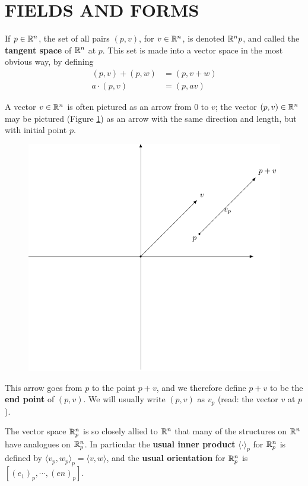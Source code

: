 \clearpage
\section{FIELDS AND FORMS}
If $p\in\mathbb{R}^n$, the set of all pairs $(p,v)$, for $v\in \mathbb{R}^n$, is denoted $\mathbb{R}^n p$, and 
called the \textbf{tangent space} of $\mathbb{R}^n$ at $p$. This set is made into a vector space in 
the most obvious way, by defining
\begin{align*}
    (p,v) + (p,w) & = (p, v+w) \\
    a\cdot (p, v) & = (p, av)
\end{align*}

A vector $v\in\mathbb{R}^n$ is often pictured as an arrow from 0 to $v$; the
vector $(p,v)\in\mathbb{R}^n$ may be pictured (Figure \ref{Fig 4-1}) as an arrow
with the same direction and length, but with initial point $p$.

\begin{figure}[H]
    \centering
    \includegraphics[width=.75\linewidth]{./pics/Fig4-1.pdf}
    \caption{}
    \label{Fig 4-1}
\end{figure}

This arrow goes from $p$ to the point $p + v$, and we therefore
define $p + v$ to be the \textbf{end point} of $(p,v)$.
We will usually write $(p,v)$ as $v_p$ (read: the vector $v$ at $p$).

The vector space $\mathbb{R}^n_p$ is so closely allied to $\mathbb{R}^n$ that many
of the structures on $\mathbb{R}^n$ have analogues on $\mathbb{R}^n_p$. 
In particular the \textbf{usual inner product} $\langle \cdot\rangle_p$ for $\mathbb{R}^n_p$ 
is defined by $\langle v_p, w_p\rangle_p = \langle v,w\rangle$, 
and the \textbf{usual orientation} for $\mathbb{R}^n_p$ is $[(e_1)_p, \cdots, (en)_p]$. 

